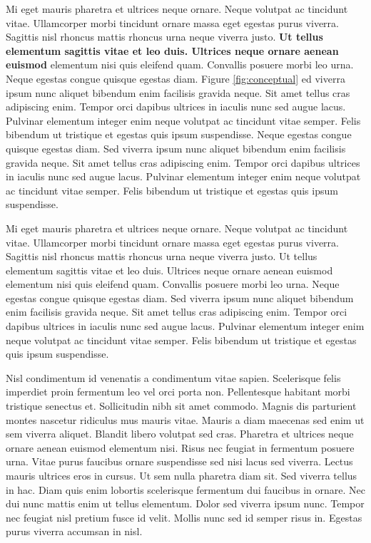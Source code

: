 \documentclass[11pt,]{article}
\begin{document}
Mi eget mauris pharetra et ultrices neque ornare. Neque volutpat ac
tincidunt vitae. Ullamcorper morbi tincidunt ornare massa eget egestas
purus viverra. Sagittis nisl rhoncus mattis rhoncus urna neque viverra
justo. \textbf{Ut tellus elementum sagittis vitae et leo duis. Ultrices
neque ornare aenean euismod} elementum nisi quis eleifend quam.
Convallis posuere morbi leo urna. Neque egestas congue quisque egestas
diam. Figure \ref{fig:conceptual} ed viverra ipsum nunc aliquet bibendum
enim facilisis gravida neque. Sit amet tellus cras adipiscing enim.
Tempor orci dapibus ultrices in iaculis nunc sed augue lacus. Pulvinar
elementum integer enim neque volutpat ac tincidunt vitae semper. Felis
bibendum ut tristique et egestas quis ipsum suspendisse. Neque egestas
congue quisque egestas diam. Sed viverra ipsum nunc aliquet bibendum
enim facilisis gravida neque. Sit amet tellus cras adipiscing enim.
Tempor orci dapibus ultrices in iaculis nunc sed augue lacus. Pulvinar
elementum integer enim neque volutpat ac tincidunt vitae semper. Felis
bibendum ut tristique et egestas quis ipsum suspendisse.

Mi eget mauris pharetra et ultrices neque ornare. Neque volutpat ac
tincidunt vitae. Ullamcorper morbi tincidunt ornare massa eget egestas
purus viverra. Sagittis nisl rhoncus mattis rhoncus urna neque viverra
justo. Ut tellus elementum sagittis vitae et leo duis. Ultrices neque
ornare aenean euismod elementum nisi quis eleifend quam. Convallis
posuere morbi leo urna. Neque egestas congue quisque egestas diam. Sed
viverra ipsum nunc aliquet bibendum enim facilisis gravida neque. Sit
amet tellus cras adipiscing enim. Tempor orci dapibus ultrices in
iaculis nunc sed augue lacus. Pulvinar elementum integer enim neque
volutpat ac tincidunt vitae semper. Felis bibendum ut tristique et
egestas quis ipsum suspendisse.

Nisl condimentum id venenatis a condimentum vitae sapien. Scelerisque
felis imperdiet proin fermentum leo vel orci porta non. Pellentesque
habitant morbi tristique senectus et. Sollicitudin nibh sit amet
commodo. Magnis dis parturient montes nascetur ridiculus mus mauris
vitae. Mauris a diam maecenas sed enim ut sem viverra aliquet. Blandit
libero volutpat sed cras. Pharetra et ultrices neque ornare aenean
euismod elementum nisi. Risus nec feugiat in fermentum posuere urna.
Vitae purus faucibus ornare suspendisse sed nisi lacus sed viverra.
Lectus mauris ultrices eros in cursus. Ut sem nulla pharetra diam sit.
Sed viverra tellus in hac. Diam quis enim lobortis scelerisque fermentum
dui faucibus in ornare. Nec dui nunc mattis enim ut tellus elementum.
Dolor sed viverra ipsum nunc. Tempor nec feugiat nisl pretium fusce id
velit. Mollis nunc sed id semper risus in. Egestas purus viverra
accumsan in nisl.
\end{document}
